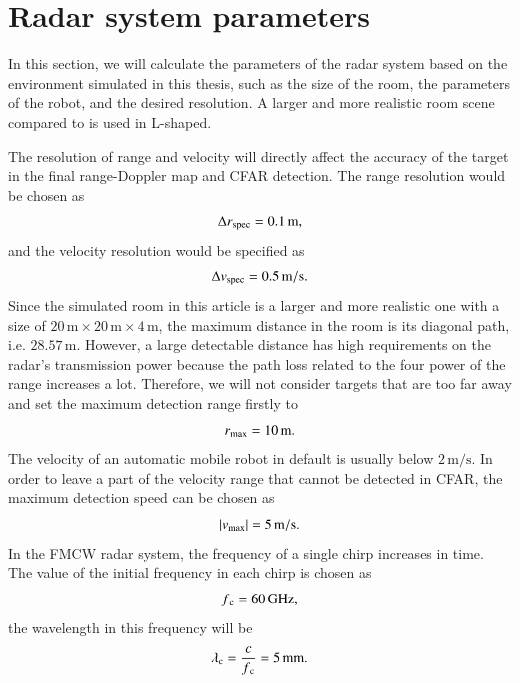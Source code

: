 \documentclass[12pt,DIV14,BCOR12mm,a4paper,footinclude=false,headinclude,parskip=half-,twoside,openright,cleardoublepage=empty,toc=index,bibliography=totoc,listof=totoc]{scrreprt}
\numberwithin{equation}{chapter}
\begin{document}
\section{Radar system parameters} \label{Radar system parameters}
In this section, we will calculate the parameters of the radar system based on the environment simulated in this thesis, such as the size of the room, the parameters of the robot, and the desired resolution. A larger and more realistic room scene compared to \cite{schlachter_indoor_2024} is used in L-shaped.

The resolution of range and velocity will directly affect the accuracy of the target in the final range-Doppler map and CFAR detection. The range resolution would be chosen as
\begin{equation}
    \centering
    \Delta r\textsubscript{spec} = 0.1\,\mathrm{m},
\end{equation}
and the velocity resolution would be specified as
\begin{equation}
    \centering
    \Delta v\textsubscript{spec} = 0.5\,\mathrm{m/s}.
\end{equation}
Since the simulated room in this article is a larger and more realistic one with a size of $20 \,\mathrm{m} \times 20 \,\mathrm{m} \times 4 \,\mathrm{m}$, the maximum distance in the room is its diagonal path, i.e. $28.57\,\mathrm{m}$. However, a large detectable distance has high requirements on the radar's transmission power because the path loss related to the four power of the range increases a lot. Therefore, we will not consider targets that are too far away and set the maximum detection range firstly to
\begin{equation}
    \centering
    r\textsubscript{max} = 10\,\mathrm{m}.
\end{equation}
The velocity of an automatic mobile robot in default is usually below $2\,\mathrm{m/s}$. In order to leave a part of the velocity range that cannot be detected in CFAR, the maximum detection speed can be chosen as
\begin{equation}
    \centering
    |v\textsubscript{max}| = 5\,\mathrm{m/s}.
\end{equation}
In the FMCW radar system, the frequency of a single chirp increases in time. The value of the initial frequency in each chirp is chosen as
\begin{equation}
    \centering
    f\textsubscript{c} = 60\,\mathrm{GHz},
\end{equation}
the wavelength in this frequency will be
\begin{equation}
    \centering
    \lambda\textsubscript{c} = \frac{c}{f\textsubscript{c}} = 5\,\mathrm{mm}.
\end{equation}
\end{document}
